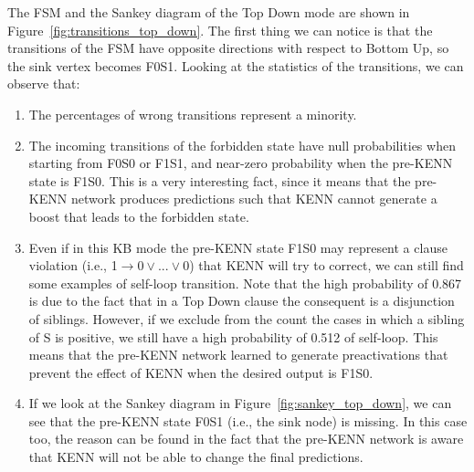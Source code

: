 The FSM and the Sankey diagram of the Top Down mode are shown in Figure~\ref{fig:transitions_top_down}. The first thing we can notice is that the transitions of the FSM have opposite directions with respect to Bottom Up, so the sink vertex becomes F0S1. Looking at the statistics of the transitions, we can observe that:
\begin{enumerate}
    \item The percentages of wrong transitions represent a minority.
    \item The incoming transitions of the forbidden state have null probabilities when starting from F0S0 or F1S1, and near-zero probability when the pre-KENN state is F1S0. This is a very interesting fact, since it means that the pre-KENN network produces predictions such that KENN cannot generate a boost that leads to the forbidden state.
    \item Even if in this KB mode the pre-KENN state F1S0 may represent a clause violation (i.e., 1$\to 0 \vee ... \vee 0$) that KENN will try to correct, we can still find some examples of self-loop transition. Note that the high probability of 0.867 is due to the fact that in a Top Down clause the consequent is a disjunction of siblings. However, if we exclude from the count the cases in which a sibling of S is positive, we still have a high probability of 0.512 of self-loop. This means that the pre-KENN network learned to generate preactivations that prevent the effect of KENN when the desired output is F1S0.
    \item If we look at the Sankey diagram in Figure~\ref{fig:sankey_top_down}, we can see that the pre-KENN state F0S1 (i.e., the sink node) is missing. In this case too, the reason can be found in the fact that the pre-KENN network is aware that KENN will not be able to change the final predictions.
\end{enumerate}

